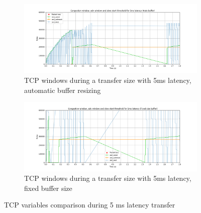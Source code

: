 \documentclass[a4paper,10pt]{article}
\begin{document}
\begin{figure}[]
\centering
\begin{subfigure}{0.8\textwidth}
    \centering
    \includegraphics[width=\textwidth]{images/5_cwnd_wnd_comparison_auto.png}
    \caption{TCP windows during a transfer size with 5ms latency, automatic buffer resizing}
    \label{fig:5ms_wnd_auto}
\end{subfigure}%
\qquad
\centering
\begin{subfigure}{0.8\textwidth}
   \centering
   \includegraphics[width=\textwidth]{images/5_cwnd_wnd_comparison_fixed.png}
   \caption{TCP windows during a transfer size with 5ms latency, fixed buffer size}
   \label{fig:5ms_wnd_fixed}
\end{subfigure}
\caption[short]{TCP variables comparison during 5 ms latency transfer}
\label{fig:tcp_variables_5ms}
\end{figure}
\end{document}
